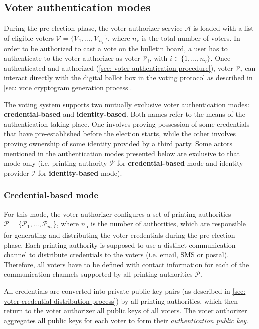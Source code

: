 \subsection{Voter authentication modes} \label{sec: voter registration modes}
During the pre-election phase, the voter authorizer service $\mathcal{A}$ is loaded with a list of eligible voters $\boldsymbol{\mathcal{V}} = \{ \mathcal{V}_1, ..., \mathcal{V}_{n_\mathrm{v}} \}$, where $n_\mathrm{v}$ is the total number of voters. In order to be authorized to cast a vote on the bulletin board, a user has to authenticate to the voter authorizer as voter $\mathcal{V}_i$, with $i \in \{ 1, ..., n_\mathrm{v} \}$. Once authenticated and authorized (\cref{sec: voter authentication procedure}), voter $\mathcal{V}_i$ can interact directly with the digital ballot box in the voting protocol as described in \cref{sec: vote cryptogram generation process}.

The voting system supports two mutually exclusive voter authentication modes: \textbf{credential-based} and \textbf{identity-based}. Both names refer to the means of the authentication taking place. One involves proving possession of some credentials that have pre-established before the election starts, while the other involves proving ownership of some identity provided by a third party. Some actors mentioned in the authentication modes presented below are exclusive to that mode only (i.e. printing authority $\mathcal{P}$ for \textbf{credential-based} mode and identity provider $\mathcal{I}$ for \textbf{identity-based} mode).


\subsubsection{Credential-based mode} \label{sec: credential-based mode}
For this mode, the voter authorizer configures a set of printing authorities $\boldsymbol{\mathcal{P}} = \{\mathcal{P}_1, ..., \mathcal{P}_{n_\mathrm{p}}\}$, where $n_\mathrm{p}$ is the number of authorities, which are responsible for generating and distributing the voter credentials during the pre-election phase. Each printing authority is supposed to use a distinct communication channel to distribute credentials to the voters (i.e. email, SMS or postal). Therefore, all voters have to be defined with contact information for each of the communication channels supported by all printing authorities $\boldsymbol{\mathcal{P}}$.

All credentials are converted into private-public key pairs (as described in \cref{sec: voter credential distribution process}) by all printing authorities, which then return to the voter authorizer all public keys of all voters. The voter authorizer aggregates all public keys for each voter to form their \textit{authentication public key}. 

